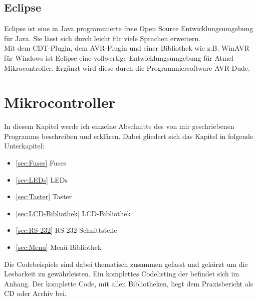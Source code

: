 \subsection{Eclipse}
Eclipse ist eine in Java programmierte freie Open Source Entwicklungsumgebung für Java. Sie lässt sich durch  leicht für viele Sprachen erweitern.\\
Mit dem CDT-Plugin, dem AVR-Plugin und einer Bibliothek wie z.B. WinAVR für Windows ist Eclipse eine vollwertige Entwicklungsumgebung für Atmel Mikrocontroller. 
Ergänzt wird diese durch die Programmiersoftware AVR-Dude.\\
\section{Mikrocontroller}
In diesem Kapitel werde ich einzelne Abschnitte des von mir geschriebenen Programms beschreiben und erklären. 
Dabei gliedert sich das Kapitel in folgende Unterkapitel:
\begin{itemize}
\item \ref{sec:Fuses} Fuses
\item \ref{sec:LEDs} LEDs
\item \ref{sec:Taster} Taster
\item \ref{sec:LCD-Bibliothek} LCD-Bibliothek
\item \ref{sec:RS-232} RS-232 Schnittstelle 
\item \ref{sec:Menu} Menü-Bibliothek
\end{itemize}

Die Codebeispiele sind dabei thematisch zusammen gefasst und gekürzt um die Lesbarkeit zu gewährleisten.
Ein komplettes Codelisting der  befindet sich im Anhang. Der komplette Code, mit allen Bibliotheken, liegt dem Praxisbericht als CD oder Archiv bei. 
